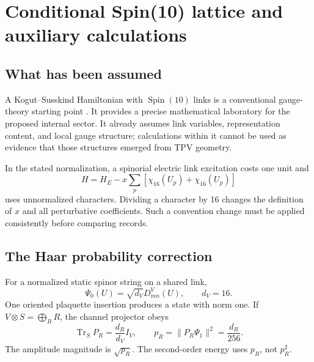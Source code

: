 \documentclass[11pt,oneside]{report}
\newcommand{\Tr}{\operatorname{Tr}}
\newcommand{\Spin}{\operatorname{Spin}}
\begin{document}
\chapter{Conditional Spin(10) lattice and auxiliary calculations}
\section{What has been assumed}
A Kogut--Susskind Hamiltonian with $\Spin(10)$ links is a conventional gauge-theory starting point \cite{KogutSusskind}. It provides a precise mathematical laboratory for the proposed internal sector. It already assumes link variables, representation content, and local gauge structure; calculations within it cannot be used as evidence that those structures emerged from TPV geometry.

In the stated normalization, a spinorial electric link excitation costs one unit and
\begin{equation}
H=H_E-x\sum_p[\chi_{16}(U_p)+\chi_{\overline{16}}(U_p)]
\end{equation}
uses unnormalized characters. Dividing a character by 16 changes the definition of $x$ and all perturbative coefficients. Such a convention change must be applied consistently before comparing records.

\section{The Haar probability correction}
For a normalized static spinor string on a shared link,
\begin{equation}
\Psi_0(U)=\sqrt{d_V}D^V_{mn}(U),\qquad d_V=16.
\end{equation}
One oriented plaquette insertion produces a state with norm one. If $V\otimes S=\bigoplus_RR$, the channel projector obeys
\begin{equation}
\Tr_S P_R=\frac{d_R}{d_V}I_V,\qquad
p_R=\|P_R\Psi_1\|^2=\frac{d_R}{256}.
\end{equation}
The amplitude magnitude is $\sqrt{p_R}$. The second-order energy uses $p_R$, not $p_R^2$.
\end{document}
